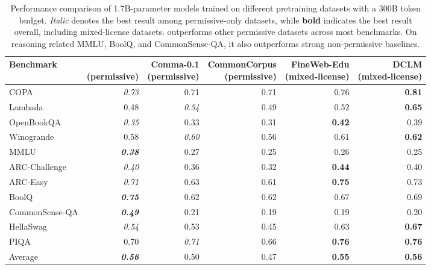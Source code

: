 \begin{table}[!th]
    \centering
    \footnotesize
\caption{Performance comparison of 1.7B-parameter models trained on different pretraining datasets with a 300B token budget.
\textit{Italic} denotes the best result among permissive-only datasets, while \textbf{bold} indicates the best result overall, including mixed-license datasets.
\MixtureVitae{} outperforms other permissive datasets across most benchmarks. On reasoning related MMLU, BoolQ, and CommonSense-QA, it also outperforms strong non-permissive baselines.}
\label{tab:lang_results}
    \footnotesize
\begin{tabular}{lrrrrr}
\toprule
Benchmark & \makecell{\MixtureVitae{}\\\scriptsize (permissive)} &
\makecell{Comma-0.1\\\scriptsize (permissive)} &
\makecell{CommonCorpus\\\scriptsize (permissive)} &
\makecell{FineWeb-Edu\\\scriptsize (mixed-license)} &
\makecell{DCLM\\\scriptsize (mixed-license)}\\
\midrule
COPA  & \textit{0.73} & 0.71 & 0.71 & 0.76 & \textbf{0.81} \\
Lambada  & 0.48 & \textit{0.54} & 0.49 & 0.52 & \textbf{0.65} \\
OpenBookQA  & \textit{0.35} & 0.33 & 0.31 & \textbf{0.42} & 0.39 \\
Winogrande & 0.58 & \textit{0.60} & 0.56 & 0.61 & \textbf{0.62} \\
MMLU & \textbf{\textit{0.38}} & 0.27 & 0.25 & 0.26 & 0.25 \\
ARC-Challenge  & \textit{0.40} & 0.36 & 0.32 & \textbf{0.44} & 0.40 \\
ARC-Easy & \textit{0.71} & 0.63 & 0.61 & \textbf{0.75} & 0.73 \\
BoolQ  & \textbf{\textit{0.75}} & 0.62 & 0.62 & 0.67 & 0.69 \\
CommonSense-QA  & \textbf{\textit{0.49}} & 0.21 & 0.19 & 0.19 & 0.20 \\
HellaSwag  & \textit{0.54} & 0.53 & 0.45 & 0.63 & \textbf{0.67} \\
PIQA  & 0.70 & \textit{0.71} & 0.66 & \textbf{0.76} & \textbf{0.76} \\
\midrule
Average & \textbf{\textit{0.56}} & 0.50 & 0.47 & \textbf{0.55} & \textbf{0.56} \\
\bottomrule
\end{tabular}
\end{table}

